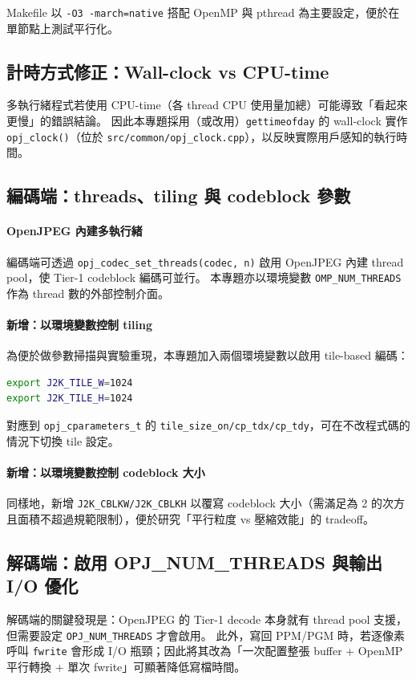 \documentclass[UTF8,a4paper,12pt]{ctexart}
\begin{document}
Makefile 以 \texttt{-O3 -march=native} 搭配 OpenMP 與 pthread 為主要設定，便於在單節點上測試平行化。

\subsection{計時方式修正：Wall-clock vs CPU-time}
多執行緒程式若使用 CPU-time（各 thread CPU 使用量加總）可能導致「看起來更慢」的錯誤結論。
因此本專題採用（或改用）\texttt{gettimeofday} 的 wall-clock 實作 \texttt{opj\_clock()}（位於 \texttt{src/common/opj\_clock.cpp}），以反映實際用戶感知的執行時間。

\subsection{編碼端：threads、tiling 與 codeblock 參數}
\paragraph{OpenJPEG 內建多執行緒}
編碼端可透過 \texttt{opj\_codec\_set\_threads(codec, n)} 啟用 OpenJPEG 內建 thread pool，使 Tier-1 codeblock 編碼可並行。
本專題亦以環境變數 \texttt{OMP\_NUM\_THREADS} 作為 thread 數的外部控制介面。

\paragraph{新增：以環境變數控制 tiling}
為便於做參數掃描與實驗重現，本專題加入兩個環境變數以啟用 tile-based 編碼：
\begin{lstlisting}[language=bash]
export J2K_TILE_W=1024
export J2K_TILE_H=1024
\end{lstlisting}
對應到 \texttt{opj\_cparameters\_t} 的 \texttt{tile\_size\_on/cp\_tdx/cp\_tdy}，可在不改程式碼的情況下切換 tile 設定。

\paragraph{新增：以環境變數控制 codeblock 大小}
同樣地，新增 \texttt{J2K\_CBLKW/J2K\_CBLKH} 以覆寫 codeblock 大小（需滿足為 2 的次方且面積不超過規範限制），便於研究「平行粒度 vs 壓縮效能」的 tradeoff。

\subsection{解碼端：啟用 OPJ\_NUM\_THREADS 與輸出 I/O 優化}
解碼端的關鍵發現是：OpenJPEG 的 Tier-1 decode 本身就有 thread pool 支援，但需要設定 \texttt{OPJ\_NUM\_THREADS} 才會啟用。
此外，寫回 PPM/PGM 時，若逐像素呼叫 \texttt{fwrite} 會形成 I/O 瓶頸；因此將其改為「一次配置整張 buffer + OpenMP 平行轉換 + 單次 fwrite」可顯著降低寫檔時間。
\end{document}
